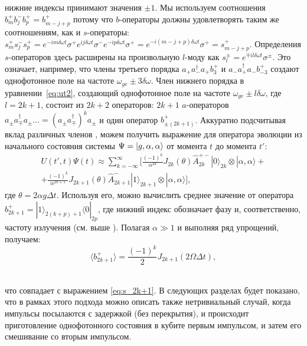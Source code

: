 нижние индексы принимают значения $\pm 1$. Мы используем соотношения $b^+_m b^-_j b^+_p = b^+_{m-j+p}$ потому что $b$-операторы должны удовлетворять таким же соотношениям, как и $s$-операторы: $s_m^+ s_j^- s_p^+ = e^{-i m\delta\omega t}\sigma^+ e^{i j\delta\omega t}\sigma^- e^{-i p\delta\omega t}\sigma^+ = e^{-i (m-j+p)\delta\omega t}\sigma^+ = s_{m-j+p}^+$. Определения $s$-операторов здесь расширены на произвольную $l$-моду как $s_l^\pm = e^{\mp i l\delta\omega t} \sigma^\pm$.  Это означает, например, что члены третьего порядка $a_+ a^\dag_- a_+ b^+_3$ и $a_- a^\dag_+ a_- b^+_{-3}$ создают однофотонное поле на частоте $\omega_{ge} \pm 3\delta\omega$. Член нижнего порядка в уравнении~\eqref{eq:ut2}, создающий однофотонное поле на частоте $\omega_{ge} \pm l\delta\omega$, где $l=2k+1$, состоит из $2k+2$ операторов: $2k+1$ $a$-операторов $a_\pm a^\dag_\mp a_\pm ... = (a_\pm a^\dag_\mp)^k a_\pm$ и один оператор $b_{\pm (2k+1)}^+$. Аккуратно подсчитывая вклад различных членов \cite{vakbib1}, можем получить выражение для оператора эволюции из начального состояния системы $\Psi = \ket{g, \alpha, \alpha}$ от момента $t$ до момента $t'$:
\begin{equation}
\begin{split}
U(t',t)\Psi(t) \approx \sum_{k=-\infty}^{\infty} \bigg[\frac{(-1)^k}{\alpha^{2k}}J_{2k}(\theta)\hat{A}_{2k}^{+-} |0\rangle_{2k} \otimes|\alpha,\alpha\rangle + \\
+ \frac{(-1)^k}{\alpha^{2k+1}}J_{2k+1}(\theta)\hat{A}_{2k+1}^{-} |1\rangle_{2k+1} \otimes|\alpha,\alpha\rangle \bigg], 
\end{split}
\end{equation}
где $\theta = 2\alpha g \Delta t$. Используя его, можно вычислить среднее значение от оператора $b^+_{2k+1} = |1\rangle_{2(k+p)+1}\langle 0|_{2p}$, где нижний индекс обозначает фазу и, соответственно, частоту излучения (см. выше
). Полагая $\alpha\gg1$ и выполняя ряд упрощений, получаем:
\begin{equation}
\langle b^+_{2k+1}\rangle = \frac{(-1)^k}{2} J_{2k+1}(2\Omega \Delta t),  
\label{eq:b2k1}
\end{equation}\

что совпадает с выражением \eqref{eq:s_2k+1}. В следующих разделах будет показано, что в рамках этого подхода можно описать также нетривиальный случай, когда импульсы посылаются с задержкой (без перекрытия), и происходит приготовление однофотонного состояния в кубите первым импульсом, и затем его смешивание со вторым импульсом. 

